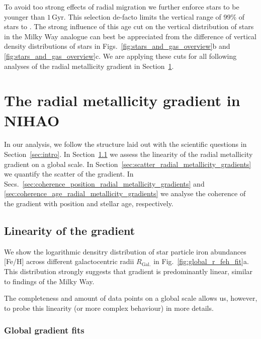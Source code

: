 \documentclass[fleqn,usenatbib]{mnras}
\begin{document}
To avoid too strong effects of radial migration \citep{Binney2008, Frankel2018} we further enforce stars to be younger than $1\,\mathrm{Gyr}$. This selection de-facto limits the vertical range of 99\% of stars to . The strong influence of this age cut on the vertical distribution of stars in the Milky Way analogue can best be appreciated from the difference of vertical density distributions of stars in Figs.~\ref{fig:stars_and_gas_overview}b and \ref{fig:stars_and_gas_overview}c. We are applying these cuts for all following analyses of the radial metallicity gradient in Section~\ref{sec:radial_metallicity_gradients}.


\section{The radial metallicity gradient in NIHAO}
\label{sec:radial_metallicity_gradients}

In our analysis, we follow the structure laid out with the scientific questions in Section~\ref{sec:intro}. In Section~\ref{sec:linear_radial_metallicity_gradients} we assess the linearity of the radial metallicity gradient on a global scale. In Section~\ref{sec:scatter_radial_metallicity_gradients} we quantify the scatter of the gradient. In Secs.~\ref{sec:coherence_position_radial_metallicity_gradients} and \ref{sec:coherence_age_radial_metallicity_gradients} we analyse the coherence of the gradient with position and stellar age, respectively.

\subsection{Linearity of the gradient}
\label{sec:linear_radial_metallicity_gradients}

We show the logarithmic densitry distribution of star particle iron abundances [Fe/H] across different galactocentric radii $R_\mathrm{Gal.}$ in Fig.~\ref{fig:global_r_feh_fit}a. This distribution strongly suggests that gradient is predominantly linear, similar to findings of the Milky Way.

The completeness and amount of data points on a global scale allows us, however, to probe this linearity (or more complex behaviour) in more details.

\subsubsection{Global gradient fits}
\end{document}
